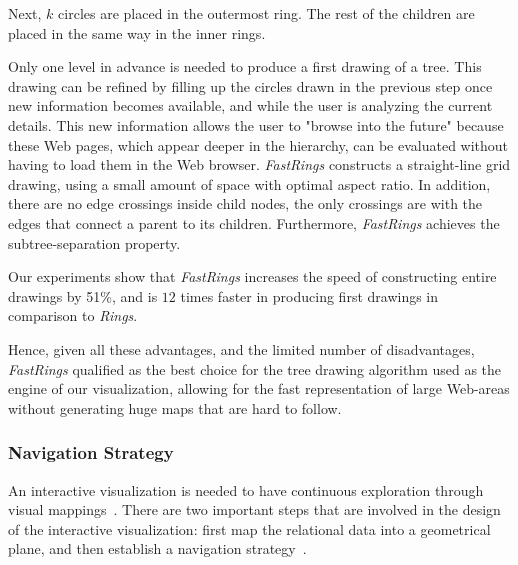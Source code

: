 \documentclass[10pt,psfig]{article}
\begin{document}
{Next, $k$ circles are placed in the outermost ring.  The rest of the children are placed in the same way in the inner rings.

Only one level in advance is needed to produce a first drawing of a tree.  
This drawing can be refined by filling up the circles drawn in the previous step once new information becomes available, and while the user is analyzing the current details.
This new information allows the user to "browse into the future" because these Web pages, which appear deeper in the hierarchy, can be evaluated without having to load them in the Web browser.
{\em FastRings} constructs a straight-line grid drawing, using a small amount of space with optimal aspect ratio.
In addition, there are no edge crossings inside child nodes, the only crossings are with the edges that connect a parent to its children.
Furthermore, {\em FastRings} achieves the subtree-separation property.


Our experiments show that {\em FastRings} increases the speed of constructing entire drawings by 51\%, and is $12$ times faster in producing first drawings in comparison to {\em Rings}.

Hence, given all these advantages, and the limited number of disadvantages, {\em FastRings} qualified as the best choice for the tree drawing algorithm used
as the engine of our visualization, allowing for the fast representation of large Web-areas without generating huge maps that are hard to follow.

\subsubsection{Navigation Strategy}
\label{se:animation}

An interactive visualization is needed to have continuous exploration through visual mappings~\cite{w-00}.
There are two important steps that are involved in the design of the interactive visualization:
first map the relational data into a geometrical plane, and then establish a navigation strategy~\cite{nh-05}.

}
\end{document}

